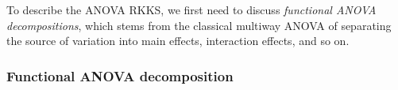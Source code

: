 %

To describe the ANOVA RKKS, we first need to discuss \emph{functional ANOVA decompositions}, which stems from the classical multiway ANOVA of separating the source of variation into main effects, interaction effects, and so on.

\subsubsection{Functional ANOVA decomposition}

